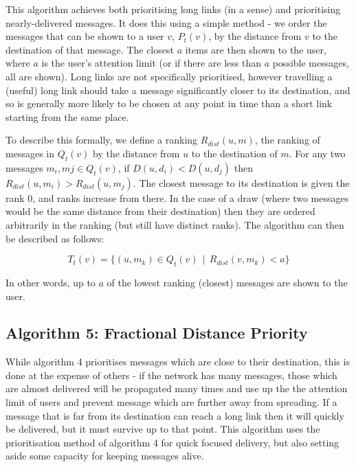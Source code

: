 \documentclass[bsc,frontabs,twoside,singlespacing,parskip,deptreport]{infthesis}     %
\begin{document}
This algorithm achieves both prioritising long links (in a sense) and prioritising nearly-delivered messages. It does this using a simple method - we order the messages that can be shown to a user $v$, $P_{t}(v)$, by the distance from $v$ to the destination of that message. The closest $a$ items are then shown to the user, where $a$ is the user's attention limit (or if there are less than $a$ possible messages, all are shown). Long links are not specifically prioritised, however travelling a (useful) long link should take a message significantly closer to its destination, and so is generally more likely to be chosen at any point in time than a short link starting from the same place.

To describe this formally, we define a ranking $R_{dist}(u, m)$, the ranking of messages in $Q_{t}(v)$ by the distance from $u$ to the destination of $m$. For any two messages $m_{i}, m{j} \in Q_{t}(v)$, if $D(u, d_{i}) < D(u, d_{j})$ then $R_{dist}(u, m_{i}) > R_{dist}(u, m_{j})$. The closest message to its destination is given the rank 0, and ranks increase from there. In the case of a draw (where two messages would be the same distance from their destination) then they are ordered arbitrarily in the ranking (but still have distinct ranks). The algorithm can then be described as follows:

\begin{equation}
T_{t}(v) = \{ (u, m_{k}) \in Q_{t}(v) \:\: | \:\: R_{dist}(v, m_{k}) < a \}
\end{equation}

In other words, up to $a$ of the lowest ranking (closest) messages are shown to the user.

\subsection{Algorithm 5: Fractional Distance Priority}
While algorithm 4 prioritises messages which are close to their destination, this is done at the expense of others - if the network has many messages, those which are almost delivered will be propagated many times and use up the the attention limit of users and prevent message which are further away from spreading. If a message that is far from its destination can reach a long link then it will quickly be delivered, but it must survive up to that point. This algorithm uses the prioritisation method of algorithm 4 for quick focused delivery, but also setting aside some capacity for keeping messages alive.
\end{document}
